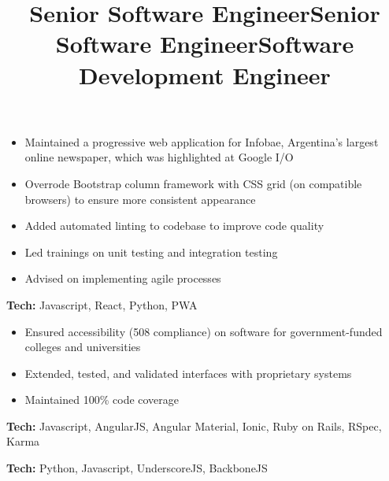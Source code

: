         \title{Senior Software Engineer}
        \begin{position}
	        \vspace{-12pt}\begin{itemize}
				\item Maintained a progressive web application for Infobae, Argentina's largest online newspaper, which was highlighted at Google I/O
				\item Overrode Bootstrap column framework with CSS grid (on compatible browsers) to ensure more consistent appearance
				\item Added automated linting to codebase to improve code quality
				\item Led trainings on unit testing and integration testing
	            \item Advised on implementing agile processes
	        \end{itemize}			
			\textbf{Tech:} Javascript, React, Python, PWA
        \end{position}
        
        \title{Senior Software Engineer}
        \begin{position}
        	\vspace{-12pt}\begin{itemize}
				\item Ensured accessibility (508 compliance) on software for government-funded colleges and universities
				\item Extended, tested, and validated interfaces with proprietary systems
				\item Maintained 100\% code coverage
			\end{itemize}
			\textbf{Tech:} Javascript, AngularJS, Angular Material, Ionic, Ruby on Rails, RSpec, Karma
        \end{position}


        \title{Software Development Engineer}
        \begin{position}
			\textbf{Tech:} Python, Javascript, UnderscoreJS, BackboneJS
        \end{position}

